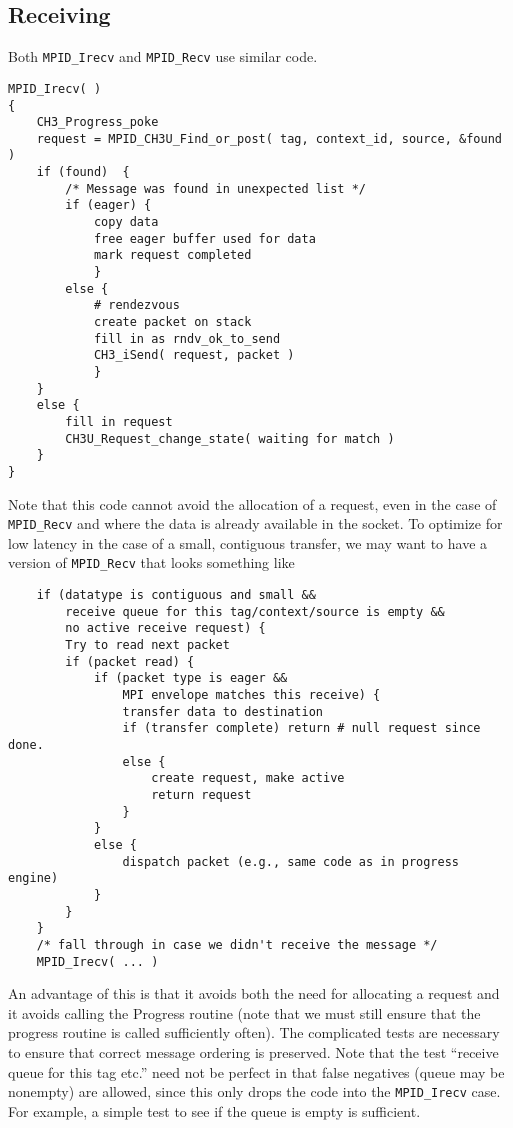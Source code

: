 \documentclass{article}
\def\code{\begingroup\makeustext\eatcode}
\def\eatcode#1{\texttt{#1}\endgroup}
\begin{document}
\subsection{Receiving}
Both \code{MPID_Irecv} and \code{MPID_Recv} use similar code.

\begin{verbatim}
MPID_Irecv( )
{
    CH3_Progress_poke
    request = MPID_CH3U_Find_or_post( tag, context_id, source, &found )
    if (found)  {
        /* Message was found in unexpected list */
        if (eager) {
            copy data
            free eager buffer used for data
            mark request completed
            }
        else {
            # rendezvous
            create packet on stack
            fill in as rndv_ok_to_send
            CH3_iSend( request, packet )
            }
    }
    else {
        fill in request
        CH3U_Request_change_state( waiting for match )
    }
}
\end{verbatim}

Note that this code cannot avoid the allocation of a request, even in
the case of \code{MPID_Recv} and where the data is already available in the
socket.  To
optimize for low latency in the case of a small, contiguous transfer,
we may want to have a version of \code{MPID_Recv} that looks something
like
\begin{verbatim}
    if (datatype is contiguous and small &&
        receive queue for this tag/context/source is empty &&
        no active receive request) {
        Try to read next packet
        if (packet read) {
            if (packet type is eager &&
                MPI envelope matches this receive) {
                transfer data to destination
                if (transfer complete) return # null request since done.
                else {
                    create request, make active
                    return request
                }
            }
            else {
                dispatch packet (e.g., same code as in progress engine)
            }
        } 
    }
    /* fall through in case we didn't receive the message */
    MPID_Irecv( ... )
\end{verbatim}
An advantage of this is that it avoids both the need for allocating a
request and it avoids calling the Progress routine (note that we must
still ensure that the progress routine is called sufficiently often).
The complicated tests are necessary to ensure that correct message
ordering is preserved. Note that the test ``receive queue for this tag
etc.'' need not be perfect in that false negatives (queue may be
nonempty) are allowed, since this only drops the code into the
\code{MPID_Irecv} case.  For example, a simple test to see if the
queue is empty is sufficient.
\end{document}
